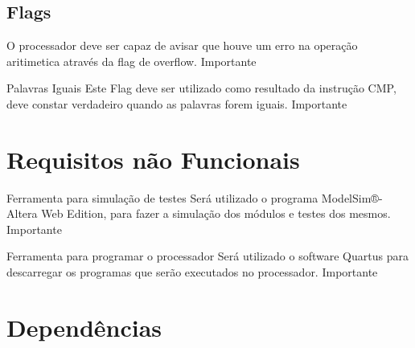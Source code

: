 \documentclass{article}
\begin{document}
\begin{functional}
{{{\begin{functional}
\begin{functional}
    \end{functional}

    \subsection{Flags}

    \begin{functional}

      {O processador deve ser capaz de avisar que houve um erro na operação aritimetica através da flag de overflow.}
      {Importante}

      \requirement
      {Palavras Iguais}
      {Este Flag deve ser utilizado como resultado da instrução CMP, deve constar verdadeiro quando as palavras forem iguais.}
      {Importante}

     \end{functional}

\section{Requisitos não Funcionais}

  \begin{nonfunctional}

    \requirement
    {Ferramenta para simulação de testes}
    {Será utilizado o programa ModelSim®-Altera Web Edition, para fazer a simulação dos módulos e testes dos mesmos.}
    {Importante}

    \requirement
    {Ferramenta para programar o processador}
    {Será utilizado o software Quartus para descarregar os programas que serão executados no processador.}
    {Importante}

  \end{nonfunctional}

\section{Dependências}

  \begin{dependencies}
\end{dependencies}

% 
% 
\end{document}
